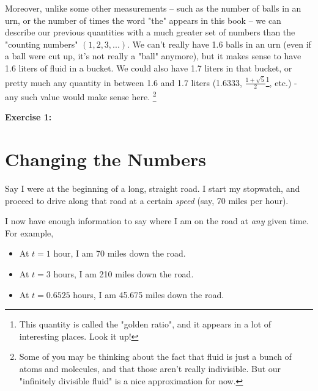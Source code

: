 \documentclass{article}
\begin{document}
Moreover, unlike some other measurements -- such as the number of balls in an urn, or the number of times the word "the" appears in this book -- we can describe our previous quantities with a much greater set of numbers than the "counting numbers" $(1, 2, 3, ...)$. We can't really have 1.6 balls in an urn (even if a ball were cut up, it's not really a "ball" anymore), but it makes sense to have 1.6 liters of fluid in a bucket. We could also have 1.7 liters in that bucket, or pretty much any quantity in between 1.6 and 1.7 liters (1.6333, $\frac{1 + \sqrt{5}}{2}$\footnote{This quantity is called the "golden ratio", and it appears in a lot of interesting places. Look it up!}, etc.) - any such value would make sense here. \footnote{Some of you may be thinking about the fact that fluid is just a bunch of atoms and molecules, and that those aren't really indivisible. But our "infinitely divisible fluid" is a nice approximation for now.}


\textbf{Exercise 1:} 



\section{Changing the Numbers}









Say I were at the beginning of a long, straight road. I start my stopwatch, and proceed to drive along that road at a certain \emph{speed} (say, 70 miles per hour). 

I now have enough information to say where I am on the road at \emph{any} given time. For example, 

\begin{itemize}
\item At $t = 1$ hour, I am 70 miles down the road.
\item At $t = 3$ hours, I am 210 miles down the road.
\item At $t = 0.6525$ hours, I am 45.675 miles down the road.
\end{itemize}
\end{document}
